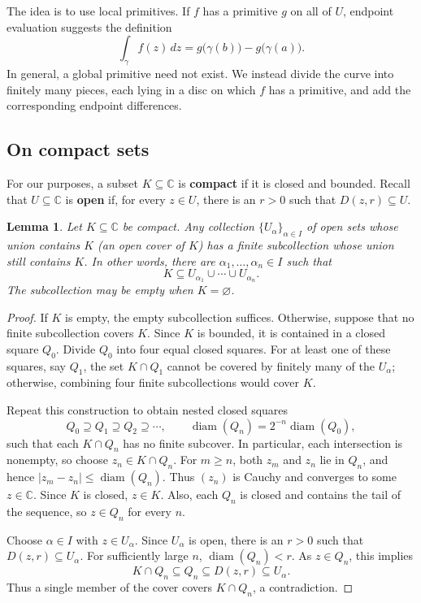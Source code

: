 \documentclass[11pt]{article}
\theoremstyle{plain}
\newtheorem{lemma}[theorem]{Lemma}
\theoremstyle{definition}
\theoremstyle{remark}
\numberwithin{equation}{section}
\newcommand{\C}{\mathbb{C}}
\begin{document}
The idea is to use local primitives. If $f$ has a primitive $g$ on all
of $U$, endpoint evaluation suggests the definition
\[
 \int_\gamma f(z)\,dz=g\bigl(\gamma(b)\bigr)-g\bigl(\gamma(a)\bigr).
\]
In general, a global primitive need not exist. We instead divide the
curve into finitely many pieces, each lying in a disc on which $f$ has
a primitive, and add the corresponding endpoint differences.

\subsection{On compact sets}

For our purposes, a subset $K\subseteq\C$ is \textbf{compact} if it is
closed and bounded. Recall that $U\subseteq\C$ is \textbf{open} if, for
every $z\in U$, there is an $r>0$ such that $D(z,r)\subseteq U$.

\begin{lemma}\label{lem:finite-subcover}
Let $K\subseteq\C$ be compact. Any collection
$\{U_\alpha\}_{\alpha\in I}$ of open sets whose union contains $K$
(an \emph{open cover} of $K$) has a finite subcollection whose union
still contains $K$. In other words, there are
$\alpha_1,\ldots,\alpha_n\in I$ such that
\[
 K\subseteq U_{\alpha_1}\cup\cdots\cup U_{\alpha_n}.
\]
The subcollection may be empty when $K=\varnothing$.
\end{lemma}
\begin{proof}
If $K$ is empty, the empty subcollection suffices. Otherwise, suppose
that no finite subcollection covers $K$. Since $K$ is bounded, it is
contained in a closed square $Q_0$. Divide $Q_0$ into four equal closed
squares. For at least one of these squares, say $Q_1$, the set
$K\cap Q_1$ cannot be covered by finitely many of the $U_\alpha$;
otherwise, combining four finite subcollections would cover $K$.

Repeat this construction to obtain nested closed squares
\[
 Q_0\supseteq Q_1\supseteq Q_2\supseteq\cdots,
 \qquad \operatorname{diam}(Q_n)=2^{-n}\operatorname{diam}(Q_0),
\]
such that each $K\cap Q_n$ has no finite subcover. In particular, each
intersection is nonempty, so choose $z_n\in K\cap Q_n$. For $m\geq n$,
both $z_m$ and $z_n$ lie in $Q_n$, and hence
$|z_m-z_n|\leq\operatorname{diam}(Q_n)$. Thus $(z_n)$ is Cauchy and
converges to some $z\in\C$. Since $K$ is closed, $z\in K$.
Also, each $Q_n$ is closed and contains the tail of the sequence, so
$z\in Q_n$ for every $n$.

Choose $\alpha\in I$ with $z\in U_\alpha$. Since $U_\alpha$ is open,
there is an $r>0$ such that $D(z,r)\subseteq U_\alpha$. For sufficiently
large $n$, $\operatorname{diam}(Q_n)<r$. As $z\in Q_n$, this implies
\[
 K\cap Q_n\subseteq Q_n\subseteq D(z,r)\subseteq U_\alpha.
\]
Thus a single member of the cover covers $K\cap Q_n$, a contradiction.
\end{proof}
\end{document}
